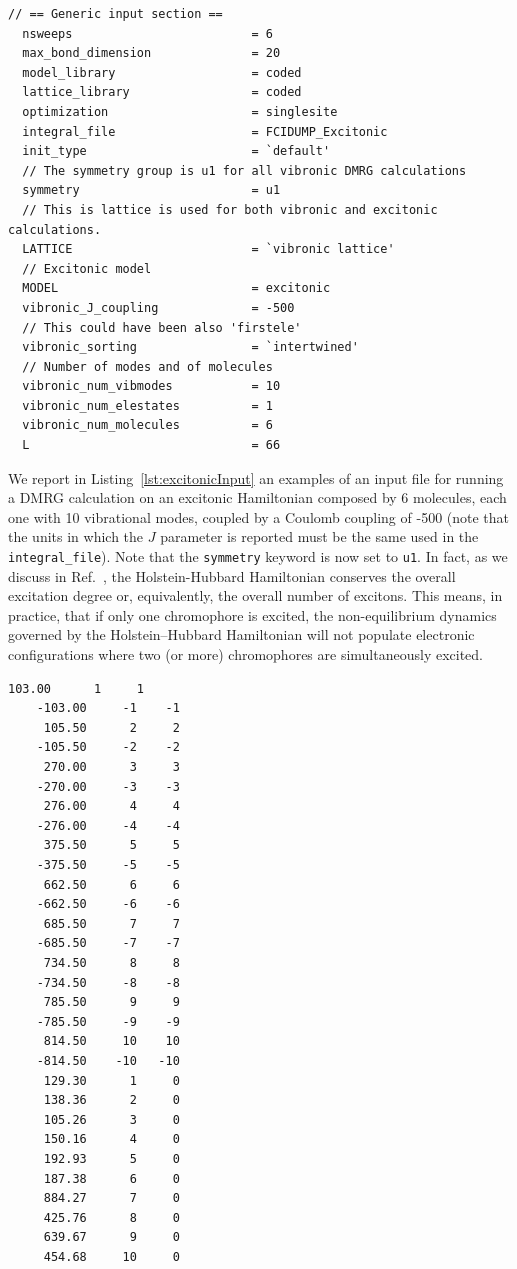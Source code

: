 \documentclass[bibliography=totoc,12pt,a4paper]{scrartcl}
\begin{document}
\begin{lstlisting}[language=qcmaquis,
				   caption={Input example for an excitonic DMRG calculation},
				   label=lst:excitonicInput]
  // == Generic input section ==
  nsweeps                         = 6
  max_bond_dimension              = 20
  model_library                   = coded
  lattice_library                 = coded
  optimization                    = singlesite
  integral_file                   = FCIDUMP_Excitonic
  init_type                       = `default'
  // The symmetry group is u1 for all vibronic DMRG calculations
  symmetry                        = u1
  // This is lattice is used for both vibronic and excitonic calculations.
  LATTICE                         = `vibronic lattice'
  // Excitonic model
  MODEL                           = excitonic
  vibronic_J_coupling             = -500
  // This could have been also 'firstele'
  vibronic_sorting                = `intertwined'
  // Number of modes and of molecules
  vibronic_num_vibmodes           = 10
  vibronic_num_elestates          = 1
  vibronic_num_molecules          = 6
  L                               = 66
\end{lstlisting}

We report in Listing~\ref{lst:excitonicInput} an examples of an input file for running a DMRG calculation on an excitonic Hamiltonian composed by 6 molecules, each one with 10 vibrational modes, coupled by a Coulomb coupling of -500 (note that the units in which the $J$ parameter is reported must be the same used in the \texttt{integral\_file}).
Note that the \texttt{symmetry} keyword is now set to \texttt{u1}.
In fact, as we discuss in Ref.~, the Holstein-Hubbard Hamiltonian conserves the overall excitation degree or, equivalently, the overall number of excitons.
This means, in practice, that if only one chromophore is excited, the non-equilibrium dynamics governed by the Holstein--Hubbard Hamiltonian will not populate electronic configurations where two (or more) chromophores are simultaneously excited.

\begin{lstlisting}[language=qcmaquis,caption={Excitonic integral file format.},
				   label=lst:excitonicDump]
	 103.00      1     1
	-103.00     -1    -1
	 105.50      2     2
	-105.50     -2    -2
	 270.00      3     3
	-270.00     -3    -3
	 276.00      4     4
	-276.00     -4    -4
	 375.50      5     5
	-375.50     -5    -5
	 662.50      6     6
	-662.50     -6    -6
	 685.50      7     7
	-685.50     -7    -7
	 734.50      8     8
	-734.50     -8    -8
	 785.50      9     9
	-785.50     -9    -9
	 814.50     10    10
	-814.50    -10   -10
	 129.30      1     0
	 138.36      2     0
	 105.26      3     0
	 150.16      4     0
	 192.93      5     0
	 187.38      6     0
	 884.27      7     0
	 425.76      8     0
	 639.67      9     0
	 454.68     10     0
\end{lstlisting}
\end{document}
